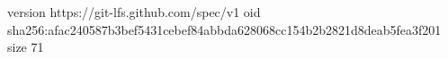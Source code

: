 version https://git-lfs.github.com/spec/v1
oid sha256:afac240587b3bef5431cebef84abbda628068cc154b2b2821d8deab5fea3f201
size 71
